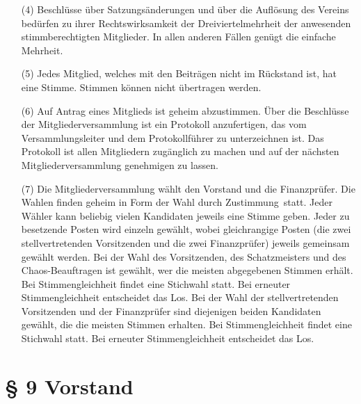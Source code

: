\documentclass[12pt,paper=a4,ngerman]{scrreprt}
\begin{document}
\begin{itemize}
\item[(4)]
Beschlüsse über Satzungsänderungen und über die Auflösung des Vereins
bedürfen zu ihrer Rechtswirksamkeit der Dreiviertelmehrheit der
anwesenden stimmberechtigten Mitglieder. In allen anderen Fällen
genügt die einfache Mehrheit.
\item[(5)]
Jedes Mitglied, welches mit den Beiträgen nicht im Rückstand ist, hat
eine Stimme. Stimmen können nicht übertragen werden.
\item[(6)]
Auf Antrag eines Mitglieds ist geheim abzustimmen. Über die Beschlüsse
der Mitgliederversammlung ist ein Protokoll anzufertigen, das vom
Versammlungsleiter und dem Protokollführer zu unterzeichnen ist. Das
Protokoll ist allen Mitgliedern zugänglich zu machen und auf der
nächsten Mitgliederversammlung genehmigen zu lassen.
\item[(7)]
Die Mitgliederversammlung wählt den Vorstand und die Finanzprüfer. Die
Wahlen finden geheim in Form der \glqq Wahl durch Zustimmung\grqq\
statt. Jeder Wähler kann beliebig vielen Kandidaten jeweils eine
Stimme geben. Jeder zu besetzende Posten wird einzeln gewählt, wobei
gleichrangige Posten (die zwei stellvertretenden Vorsitzenden und die
zwei Finanzprüfer) jeweils gemeinsam gewählt werden. Bei der Wahl des
Vorsitzenden, des Schatzmeisters und des Chaos-Beauftragen ist
gewählt, wer die meisten abgegebenen Stimmen erhält. Bei
Stimmengleichheit findet eine Stichwahl statt. Bei erneuter
Stimmengleichheit entscheidet das Los. Bei der Wahl der
stellvertretenden Vorsitzenden und der Finanzprüfer sind diejenigen
beiden Kandidaten gewählt, die die meisten Stimmen erhalten. Bei
Stimmengleichheit findet eine Stichwahl statt. Bei erneuter
Stimmengleichheit entscheidet das Los.
\end{itemize}

\section{\S{} 9 Vorstand}
\end{document}
